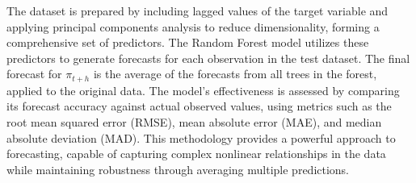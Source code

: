 The dataset is prepared by including lagged values of the target variable and applying principal components analysis to reduce dimensionality, forming a comprehensive set of predictors. The Random Forest model utilizes these predictors to generate forecasts for each observation in the test dataset. The final forecast for $\pi_{t+h}$ is the average of the forecasts from all trees in the forest, applied to the original data. The model's effectiveness is assessed by comparing its forecast accuracy against actual observed values, using metrics such as the root mean squared error (RMSE), mean absolute error (MAE), and median absolute deviation (MAD). This methodology provides a powerful approach to forecasting, capable of capturing complex nonlinear relationships in the data while maintaining robustness through averaging multiple predictions.





